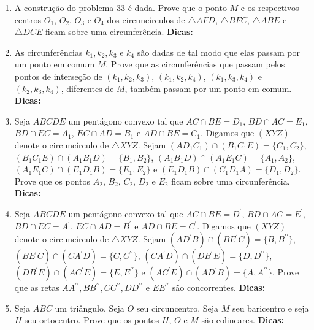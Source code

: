 \documentclass{article}
\newcommand{\dica}{\textbf{Dicas:}}
\newcommand{\iniTri}{Seja $ABC$ um triângulo}
\begin{document}
\begin{multicols}{2}
\begin{enumerate}
    \item A construção do problema $33$ é dada. Prove que o ponto $M$ e os respectivos centros $O_1$, $O_2$, $O_3$ e $O_4$ dos circuncírculos de $\triangle AFD$, $\triangle BFC$, $\triangle ABE$ e $\triangle DCE$ ficam sobre uma circunferência. \dica %
    
    \item As circunferências $k_1,k_2,k_3$ e $k_4$ são dadas de tal modo que elas passam por um ponto em comum $M$. Prove que as circunferências que passam pelos pontos de interseção de $(k_1,k_2,k_3)$, $(k_1,k_2,k_4)$, $(k_1,k_3,k_4)$ e $(k_2,k_3,k_4)$, diferentes de $M$, também passam por um ponto em comum. \dica %
    
    \item Seja $ABCDE$ um pentágono convexo tal que $AC\cap BE=D_1$, $BD\cap AC=E_1$, $BD\cap EC=A_1$, $EC\cap AD=B_1$ e $AD\cap BE=C_1$. Digamos que $(XYZ)$ denote o circuncírculo de $\triangle XYZ$. Sejam $(AD_1C_1)\cap(B_1C_1E)=\{C_1,C_2\}$, $(B_1C_1E)\cap(A_1B_1D)=\{B_1,B_2\}$, $(A_1B_1D)\cap(A_1E_1C)=\{A_1,A_2\}$, $(A_1E_1C)\cap(E_1D_1B)=\{E_1,E_2\}$ e $(E_1D_1B)\cap(C_1D_1A)=\{D_1,D_2\}$. Prove que os pontos $A_2$, $B_2$, $C_2$, $D_2$ e $E_2$ ficam sobre uma circunferência. \dica %
    
    \item Seja $ABCDE$ um pentágono convexo tal que $AC\cap BE=D^{\prime}$, $BD\cap AC=E^{\prime}$, $BD\cap EC=A^{\prime}$, $EC\cap AD=B^{\prime}$ e $AD\cap BE=C^{\prime}$. Digamos que $(XYZ)$ denote o circuncírculo de $\triangle XYZ$. Sejam $(AD^{\prime}B)\cap(BE^{\prime}C)=\{B,B^{\prime\prime}\}$, $(BE^{\prime}C)\cap(CA^{\prime}D)=\{C,C^{\prime\prime}\}$, $(CA^{\prime}D)\cap(DB^{\prime}E)=\{D,D^{\prime\prime}\}$, $(DB^{\prime}E)\cap(AC^{\prime}E)=\{E,E^{\prime\prime}\}$ e $(AC^{\prime}E)\cap(AD^{\prime}B)=\{A,A^{\prime\prime}\}$. Prove que as retas $AA^{\prime\prime},BB^{\prime\prime},CC^{\prime\prime},DD^{\prime\prime}$ e $EE^{\prime\prime}$ são concorrentes. \dica %
    
    
    \item \iniTri. Seja $O$ seu circuncentro. Seja $M$ seu baricentro e seja $H$ seu ortocentro. Prove que os pontos $H$, $O$ e $M$ são colineares. \dica %
    

\end{enumerate}
\end{multicols}
\end{document}
